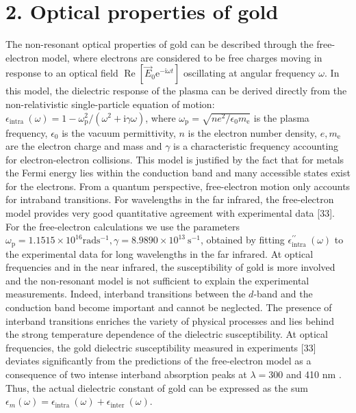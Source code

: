 \documentclass[10pt]{article}
\begin{document}
\section*{2. Optical properties of gold}
The non-resonant optical properties of gold can be described through the free-electron model, where electrons are considered to be free charges moving in response to an optical field $\operatorname{Re}\left[\vec{E}_{0} \mathrm{e}^{-\mathrm{i} \omega t}\right]$ oscillating at angular frequency $\omega$. In this model, the dielectric response of the plasma can be derived directly from the non-relativistic single-particle equation of motion: $\epsilon_{\text {intra }}(\omega)=1-\omega_{\mathrm{p}}^{2} /\left(\omega^{2}+\mathrm{i} \gamma \omega\right)$, where $\omega_{\mathrm{p}}=\sqrt{n e^{2} / \epsilon_{0} m_{\mathrm{e}}}$ is the plasma frequency, $\epsilon_{0}$ is the vacuum permittivity, $n$ is the electron number density, $e, m_{\mathrm{e}}$ are the electron charge and mass and $\gamma$ is a characteristic frequency accounting for electron-electron collisions. This model is justified by the fact that for metals the Fermi energy lies within the conduction band and many accessible states exist for the electrons. From a quantum perspective, free-electron motion only accounts for intraband transitions. For wavelengths in the far infrared, the free-electron model provides very good quantitative agreement with experimental data [33]. For the free-electron calculations we use the parameters $\omega_{\mathrm{p}}=1.1515 \times 10^{16} \mathrm{rad} \mathrm{s}^{-1}, \gamma=8.9890 \times 10^{13} \mathrm{~s}^{-1}$, obtained by fitting $\epsilon_{\text {intra }}^{\prime \prime}(\omega)$ to the experimental data for long wavelengths in the far infrared. At optical frequencies and in the near infrared, the susceptibility of gold is more involved and the non-resonant model is not sufficient to explain the experimental measurements. Indeed, interband transitions between the $d$-band and the conduction band become important and cannot be neglected. The presence of interband transitions enriches the variety of physical processes and lies behind the strong temperature dependence of the dielectric susceptibility. At optical frequencies, the gold dielectric susceptibility measured in experiments [33] deviates significantly from the predictions of the free-electron model as a consequence of two intense interband absorption peaks at $\lambda=300$ and 410 nm . Thus, the actual dielectric constant of gold can be expressed as the sum $\epsilon_{m}(\omega)=\epsilon_{\text {intra }}(\omega)+\epsilon_{\text {inter }}(\omega)$.
\end{document}
